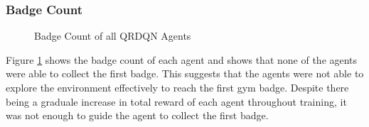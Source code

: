 \subsubsection{Badge Count}

\begin{figure}[H]
    \centering
    \caption{Badge Count of all QRDQN Agents}
    \label{fig:QRDQN_badge_count}
\end{figure}

Figure \ref{fig:QRDQN_badge_count} shows the badge count of each agent and shows that none of the agents were able to collect the first badge. This suggests that the agents were not able to explore the environment effectively to reach the first gym badge. Despite there being a graduale increase in total reward of each agent throughout training, it was not enough to guide the agent to collect the first badge. 

